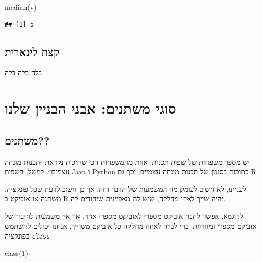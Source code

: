 \documentclass[
]{book}
\newenvironment{Shaded}{\begin{snugshade}}{\end{snugshade}}
\newcommand{\DecValTok}[1]{\textcolor[rgb]{0.00,0.00,0.81}{#1}}
\newcommand{\FunctionTok}[1]{\textcolor[rgb]{0.00,0.00,0.00}{#1}}
\newcommand{\NormalTok}[1]{#1}
\begin{document}
\begin{Shaded}
\begin{Highlighting}[]
\FunctionTok{median}\NormalTok{(v)}
\end{Highlighting}
\end{Shaded}

\begin{verbatim}
## [1] 5
\end{verbatim}

\hypertarget{ux5e7ux5e6ux5ea-ux5dcux5d9ux5e0ux5d0ux5e8ux5d9ux5ea}{%
\section{קצת לינארית}\label{ux5e7ux5e6ux5ea-ux5dcux5d9ux5e0ux5d0ux5e8ux5d9ux5ea}}

בלה בלה בלה

\hypertarget{ux5e1ux5d5ux5d2ux5d9-ux5deux5e9ux5eaux5e0ux5d9ux5dd-ux5d0ux5d1ux5e0ux5d9-ux5d4ux5d1ux5e0ux5d9ux5d9ux5df-ux5e9ux5dcux5e0ux5d5}{%
\chapter{סוגי משתנים: אבני הבניין שלנו}\label{ux5e1ux5d5ux5d2ux5d9-ux5deux5e9ux5eaux5e0ux5d9ux5dd-ux5d0ux5d1ux5e0ux5d9-ux5d4ux5d1ux5e0ux5d9ux5d9ux5df-ux5e9ux5dcux5e0ux5d5}}

\hypertarget{ux5deux5e9ux5eaux5e0ux5d9ux5dd}{%
\section{משתנים??}\label{ux5deux5e9ux5eaux5e0ux5d9ux5dd}}

יש מספר משפחות של שפות תכנות. אחת מהמשפחות הכי שחיכות נקראת ״תכנות מונחה עצמים״. למשל,
השפות
Java
ו
Python
כתובות בסגנון של תכנות מונחה עצמיים, וכך גם
R.

לעניינו, לא חשוב לעומק מה המשמעות של הדבר הזה,
אך כן חשוב לדעת שכל פונקציה, משתנה או אוביקט ב
R
יהיה שייך לאיזו מחלקה, שיש לה מאפיינים שיחודים לה.

לדוגמא, אפשר לחבר אוביקט מספרי לאוביקט מספרי אחר, אך אין משמעות לחיבור של אוביקט מספרי ומחרוזת. כדי לברר לאיזה
מחלקה כל אוביקט משוייך, אנחנו יכולים להשתמש בפונקציה
\texttt{class}

\begin{Shaded}
\begin{Highlighting}[]
\FunctionTok{class}\NormalTok{(}\DecValTok{1}\NormalTok{)}
\end{Highlighting}
\end{Shaded}
\end{document}
